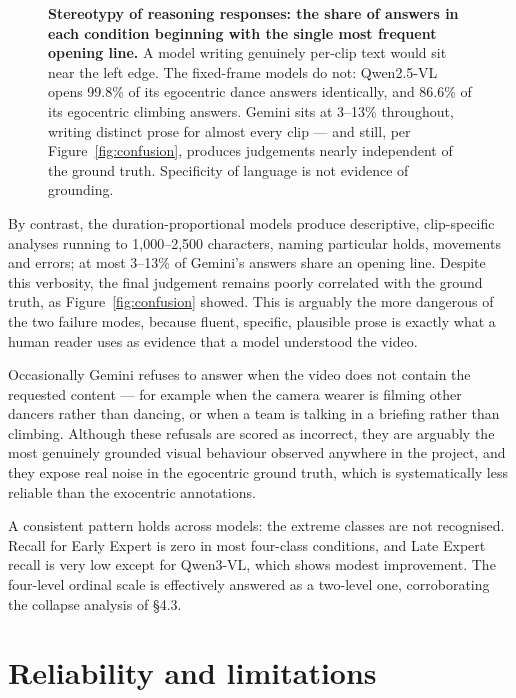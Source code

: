 \documentclass[logo,msc]{infthesis}
\begin{document}
\begin{figure}[H]
\caption[Stereotypy of reasoning responses]{\textbf{Stereotypy of reasoning
responses: the share of answers in each condition beginning with the single
most frequent opening line.} A model writing genuinely per-clip text would
sit near the left edge. The fixed-frame models do not: Qwen2.5-VL opens
99.8\% of its egocentric dance answers identically, and 86.6\% of its
egocentric climbing answers. Gemini sits at 3--13\% throughout, writing
distinct prose for almost every clip --- and still, per
Figure~\ref{fig:confusion}, produces judgements nearly independent of the
ground truth. Specificity of language is not evidence of grounding.}
\label{fig:stereotypy}
\end{figure}

By contrast, the duration-proportional models produce descriptive,
clip-specific analyses running to 1{,}000--2{,}500 characters, naming
particular holds, movements and errors; at most 3--13\% of Gemini's answers
share an opening line. Despite this verbosity, the final judgement remains
poorly correlated with the ground truth, as
Figure~\ref{fig:confusion} showed. This is arguably the more dangerous of
the two failure modes, because fluent, specific, plausible prose is exactly
what a human reader uses as evidence that a model understood the video.

Occasionally Gemini refuses to answer when the video does not contain the
requested content --- for example when the camera wearer is filming other
dancers rather than dancing, or when a team is talking in a briefing rather
than climbing. Although these refusals are scored as incorrect, they are
arguably the most genuinely grounded visual behaviour observed anywhere in
the project, and they expose real noise in the egocentric ground truth,
which is systematically less reliable than the exocentric annotations.

A consistent pattern holds across models: the extreme classes are not
recognised. Recall for Early Expert is zero in most four-class conditions,
and Late Expert recall is very low except for Qwen3-VL, which shows modest
improvement. The four-level ordinal scale is effectively answered as a
two-level one, corroborating the collapse analysis of §4.3.

\section{Reliability and limitations}
\end{document}
